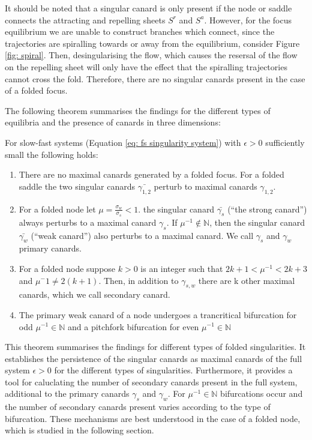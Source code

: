 It should be noted that a singular canard is only present if the node or saddle connects the attracting and repelling sheets $ S^r $ and $ S^a $.
However, for the focus equilibrium we are unable to construct branches which connect, since the trajectories are spiralling towards or away from the equilibrium, consider Figure \ref{fig: spiral}. Then, desingularising the flow, which causes the resersal of the flow on the repelling sheet will only have the effect that the spiralling trajectories cannot cross the fold. Therefore, there are no singular canards present in the case of a folded focus.

The following theorem summarises the findings for the different types of equilibria and the presence of canards in three dimensions:
\begin{theorem}\label{thm: canards in R3}
	For slow-fast systems (Equation \ref{eq: fs singularity system}) with $ \epsilon>0 $ sufficiently small the following holds:
\begin{enumerate}
\item  There are no maximal canards generated by a folded focus. For a folded saddle the two singular canards $ \bar{\gamma_{1,2}} $ perturb to maximal canards $ \gamma_{1,2} $.
\item  For a folded node let $\mu=\frac{\sigma_w}{\sigma_s} <1$. the singular canard $ \bar{\gamma_{s}} $ (``the strong canard'') always perturbs to a maximal canard $ \gamma_{s} $. If $ \mu^{-1}\not \in \mathbb{N} $, then the singular canard $ \bar{\gamma_{w}} $ (``weak canard'') also perturbs to a maximal canard. We call $ \gamma_{s} $ and $ \gamma_{w} $ primary canards.
\item For a folded node suppose $ k>0 $ is an integer such that $ 2k+1<\mu^{-1} <2k+3$ and $ \mu^-1\neq 2(k+1) $. Then, in addition to $ \gamma_{s,w} $ there are k other maximal canards, which we call secondary canard.
\item The primary weak canard of a node undergoes a trancritical bifurcation for odd $ \mu^{-1}\in\mathbb{N} $ and a pitchfork bifurcation for even $ \mu^{-1}\in\mathbb{N} $
\end{enumerate}
\end{theorem}
This theorem summarises the findings for different types of folded singularities. It establishes the persistence of the singular canards as maximal canards of the full system $\epsilon >0$ for the different types of singularities. Furthermore, it provides a tool for caluclating the number of secondary canards present in the full system, additional to the primary canards $\gamma_s$ and $\gamma_w$.
For $ \mu^{-1}\in\mathbb{N} $ bifurcations occur and the number of secondary canards present varies according to the type of bifurcation.
These mechanisms are best understood in the case of a folded node, which is studied in the following section.


